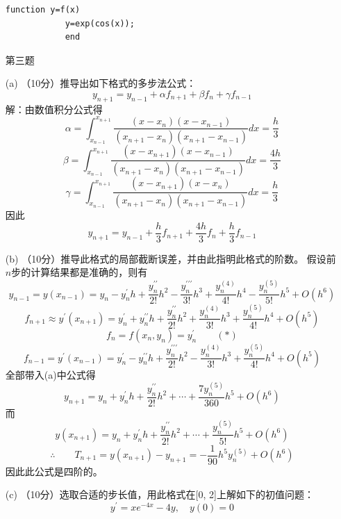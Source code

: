 \documentclass[12pt,a4paper,utf8]{ctexart}
\begin{document}
\begin{enumerate}
\begin{lstlisting}[breaklines,frame=single]
			function y=f(x)
			y=exp(cos(x));
			end
		\end{lstlisting}
		\item[第三题]
		\item[(a)]（10分）推导出如下格式的多步法公式：
		\begin{equation}
			y_{n+1}=y_{n-1}+\alpha f_{n+1}+\beta f_{n}+\gamma f_{n-1}
		\end{equation}
		解：由数值积分公式得\\$$
		\alpha=\int_{x_{n-1}}^{x_{n+1}} \frac{\left(x-x_{n}\right)\left(x-x_{n-1}\right)}{\left(x_{n+1}-x_{n}\right)\left(x_{n+1}-x_{n-1}\right)} dx = \frac{h}{3}$$
		$$\beta=\int_{x_{n-1}}^{x_{n+1}} \frac{\left(x-x_{n+1}\right)\left(x-x_{n-1}\right)}{\left(x_{n+1}-x_{n}\right)\left(x_{n+1}-x_{n-1}\right)} dx = \frac{4h}{3}$$
		$$\gamma=\int_{x_{n-1}}^{x_{n+1}} \frac{\left(x-x_{n+1}\right)\left(x-x_{n}\right)}{\left(x_{n+1}-x_{n}\right)\left(x_{n+1}-x_{n-1}\right)} dx = \frac{h}{3}$$
		因此$$y_{n+1}=y_{n-1}+\frac{h}{3} f_{n+1}+\frac{4h}{3} f_{n}+\frac{h}{3} f_{n-1}$$
		\item[(b)]（10分）推导此格式的局部截断误差，并由此指明此格式的阶数。
		假设前$n$步的计算结果都是准确的，则有\\ $$
		y_{n-1}=y(x_{n-1})=y_{n}-y_{n}^{\prime} h+\frac{y_{n}^{\prime \prime}}{2 !} h^{2}-\frac{y_{n}^{\prime \prime \prime}}{3 !} h^{3}+\frac{y_{n}^{(4)}}{4!}h^{4}-\frac{y_{n}^{(5)}}{5 !} h^{5}+O\left(h^{6}\right)$$ $$
		f_{n+1}\approx y^{\prime}\left(x_{n+1}\right)=y_{n}^{\prime}+y_{n}^{\prime \prime} h+\frac{y_{n}^{\prime \prime}}{2 !} h^{2}+\frac{y_{n}^{(4)}}{3 !} h^{3}+\frac{y_{n}^{(5)}}{4 !} h^{4}+O\left(h^{5}\right)$$ $$
		f_{n}=f\left(x_{n}, y_{n}\right)=y^{'}_{n}\qquad (*)$$ $$
		f_{n-1}=y^{\prime}\left(x_{n-1}\right)=y_{n}^{\prime}-y_{n}^{\prime \prime} h+\frac{y_{n}^{\prime \prime \prime}}{2 !} h^{2}-\frac{y_{n}^{(4)}}{3 !} h^{3}+\frac{y_{n}^{(5)}}{4 !} h^{4}+O\left(h^{5}\right)$$
		全部带入(a)中公式得$$
		y_{n+1}=y_{n}+y_{n}^{\prime} h+\frac{y_{n}^{\prime \prime}}{2 !} h^{2}+\cdots+\frac{7y_{n}^{(5)}}{360} h^{5}+O\left(h^{6}\right)$$
		而$$
		y(x_{n+1})=y_{n}+y_{n}^{\prime} h+\frac{y_{n}^{\prime \prime}}{2 !} h^{2}+\cdots+\frac{y_{n}^{(5)}}{5 !} h^{5}+O\left(h^{6}\right)$$ $$ 
		\therefore\qquad T_{n+1}=y(x_{n+1})-y_{n+1}=-\frac{1}{90} h^{5}y_{n}^{(5)}+O\left(h^{6}\right)$$
		因此此公式是四阶的。
		\item[(c)]（10分）选取合适的步长值，用此格式在[0, 2]上解如下的初值问题：
		\begin{equation}
			y^{\prime}=x e^{-4 x}-4 y, \quad y(0)=0
		\end{equation}

\end{enumerate}
\end{document}
